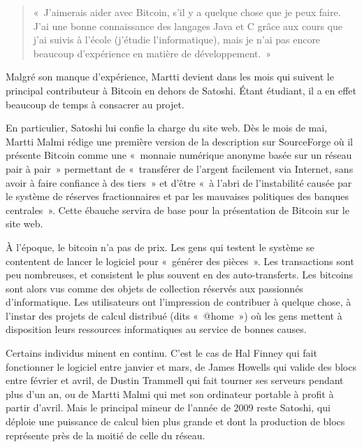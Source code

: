 \begin{quote}
«~J'aimerais aider avec Bitcoin, s'il y a quelque chose que je peux faire. J'ai une bonne connaissance des langages Java et C grâce aux cours que j'ai suivis à l'école (j'étudie l'informatique), mais je n'ai pas encore beaucoup d'expérience en matière de développement.~»
\end{quote}

Malgré son manque d'expérience, Martti devient dans les mois qui suivent le principal contributeur à Bitcoin en dehors de Satoshi. Étant étudiant, il a en effet beaucoup de temps à consacrer au projet.

En particulier, Satoshi lui confie la charge du site web. Dès le mois de mai, Martti Malmi rédige une première version de la description sur SourceForge où il présente Bitcoin comme une «~monnaie numérique anonyme basée sur un réseau pair à pair~» permettant de «~transférer de l'argent facilement via Internet, sans avoir à faire confiance à des tiers~» et d'être «~à l'abri de l'instabilité causée par le système de réserves fractionnaires et par les mauvaises politiques des banques centrales~». Cette ébauche servira de base pour la présentation de Bitcoin sur le site web.


À l'époque, le bitcoin n'a pas de prix. Les gens qui testent le système se contentent de lancer le logiciel pour «~générer des pièces~». Les transactions sont peu nombreuses, et consistent le plus souvent en des auto-transferts. Les bitcoins sont alors vus comme des objets de collection réservés aux passionnés d'informatique. Les utilisateurs ont l'impression de contribuer à quelque chose, à l'instar des projets de calcul distribué (dits «~@home~») où les gens mettent à disposition leurs ressources informatiques au service de bonnes causes.

Certains individus minent en continu. C'est le cas de Hal Finney qui fait fonctionner le logiciel entre janvier et mars, de James Howells qui valide des blocs entre février et avril, de Dustin Trammell qui fait tourner ses serveurs pendant plus d'un an, ou de Martti Malmi qui met son ordinateur portable à profit à partir d'avril. Mais le principal mineur de l'année de 2009 reste Satoshi, qui déploie une puissance de calcul bien plus grande et dont la production de blocs représente près de la moitié de celle du réseau.

